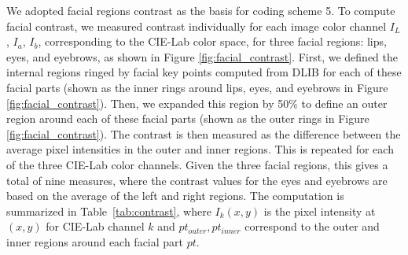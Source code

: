 \documentclass[letterpaper,11pt]{article}
\begin{document}
We adopted facial regions contrast as the basis for coding scheme 5. To compute facial contrast, we measured contrast individually for each image color channel $I_{L}$, $I_{a}$, $I_{b}$, corresponding to the CIE-Lab color space, for three facial regions: lips, eyes, and eyebrows, as shown in Figure \ref{fig:facial_contrast}.  First, we defined the internal regions ringed by facial key points computed from DLIB for each of these facial parts (shown as the inner rings around lips, eyes, and eyebrows in Figure \ref{fig:facial_contrast}). Then, we expanded this region by 50\% to define an outer region around each of these facial parts (shown as the outer rings in Figure \ref{fig:facial_contrast}). The contrast is then measured as the difference between the average pixel intensities in the outer and inner regions.  This is repeated for each of the three CIE-Lab color channels.  Given the three facial regions, this gives a total of nine measures, where the contrast values for the eyes and eyebrows are based on the average of the left and right regions.  The computation is summarized in Table~\ref{tab:contrast}, where $I_{k}(x,y)$ is the pixel intensity at $(x,y)$ for CIE-Lab channel $k$ and $pt_{outer}, pt_{inner}$ correspond to the outer and inner regions around each facial part $pt$.
\end{document}
